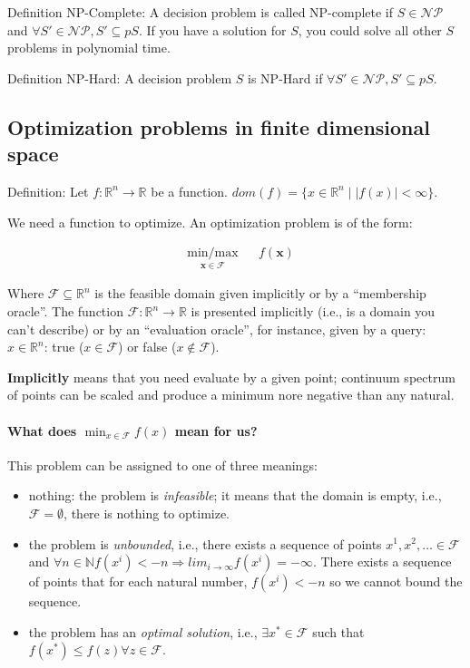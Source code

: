 \documentclass[main]{subfiles}
\begin{document}
Definition NP-Complete: A decision problem is called NP-complete if $S \in
\mathcal{NP}$ and $\forall S' \in \mathcal{NP}, S' \subseteq pS$. If you have a
solution for $S$, you could solve all other $S$ problems in polynomial time.

Definition NP-Hard: A decision problem $S$ is NP-Hard if $\forall S' \in
\mathcal{NP}, S' \subseteq pS$.


\subsection{Optimization problems in finite dimensional space}
Definition: Let $f: \mathbb{R}^{n} \rightarrow \mathbb{R}$ be a function.
$dom(f) = \{ x \in \mathbb{R}^{n} \mid \left| f(x) \right| < \infty \}$.

We need a function to optimize. An optimization problem is of the form: 

\begin{equation*}
\begin{aligned}
& \underset{\mathbf{x \in \mathcal{F}}}{\text{min/max}}
& & f(\mathbf{x})
\end{aligned}
\label{eq:sampleOptimizationProblem}
\end{equation*}

Where $\mathcal{F} \subseteq \mathbb{R}^{n}$ is the feasible domain given
implicitly or by a ``membership oracle''. The function
$\mathcal{F}: \mathbb{R}^{n} \rightarrow \mathbb{R}$ is presented implicitly
(i.e., is a domain you can't describe) or by an ``evaluation oracle'', for
instance, given by a query: $x \in \mathbb{R}^{n}$: true ($x \in \mathcal{F}$)
or false ($x \notin \mathcal{F}$).

\textbf{Implicitly} means that you need evaluate by a given point; continuum
spectrum of points can be scaled and produce a minimum nore negative than any
natural.

\paragraph{What does $\displaystyle \min_{x \in \mathcal{F}} f(x)$ mean for
us?}
This problem can be assigned to one of three meanings:
\begin{itemize} \label{items:optimization-conclusions}
\item nothing: the problem is \emph{infeasible}; it means that the domain is
empty, i.e., $\mathcal{F} = \emptyset$, there is nothing to optimize.
\item the problem is \emph{unbounded}, i.e., there exists a sequence of
points $x^{1}, x^{2}, \dots \in \mathcal{F}$ and $\forall n \in \mathbb{N}
f(x^{i}) < -n \Rightarrow lim_{i \rightarrow \infty} f(x^{i}) = -\infty$.
There exists a sequence of points that for each natural number, $f(x^{i}) < -n$
so we cannot bound the sequence.
\item the problem has an \emph{optimal solution}, i.e., $\exists x^{*} \in
\mathcal{F}$ such that $f(x^{*}) \leq f(z) \forall z \in \mathcal{F}$.
\end{itemize}
\end{document}
